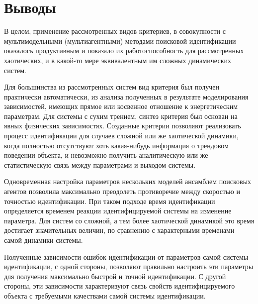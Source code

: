 \chapter*{Выводы}

В целом, применение рассмотренных видов критериев, в совокупности
с мультимодельными (мультиагентными) методами поисковой идентификации
оказалось продуктивным и показало их
работоспособность для рассмотренных хаотических, и в какой-то мере эквивалентным им
сложных динамических систем.



Для большинства из рассмотренных систем вид критерия
был получен практически автоматически, из анализа полученных
в результате моделирования зависимостей, имеющих прямое или косвенное отношение
к энергетическим параметрам. Для системы с сухим трением,
синтез критерия был основан на явных физических зависимостях.
Созданные критерии позволяют реализовать процесс идентификации для случаев
сложной или же хаотической динамики,
когда полностью отсутствуют хоть какая-нибудь информация о
трендовом поведении объекта, и невозможно получить аналитическую
или же статистическую связь между параметрами и выходом системы.

Одновременная настройка параметров нескольких моделей ансамблем поисковых агентов
позволила максимально преодолеть противоречие между скоростью и точностью
идентификации. При таком подходе время идентификации определяется
временем реакции идентифицируемой системы на изменение параметра.
Для систем со сложной, а тем более хаотической динамикой это время достигает
значительных величин, по сравнению с характерными временами самой динамики системы.


Полученные зависимости ошибок идентификации от параметров
самой системы идентификации, с одной стороны, позволяют
правильно настроить эти параметры для получения максимально быстрой
и точной идентификации. С другой стороны, эти зависимости
характеризуют связь свойств идентифицируемого объекта с
требуемыми качествами самой системы идентификации.
